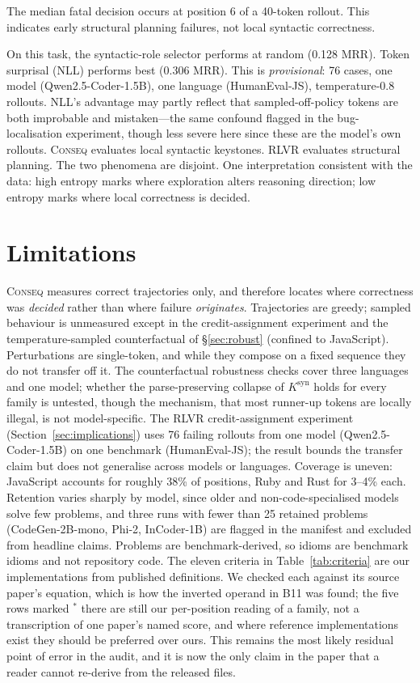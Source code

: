 \documentclass[twoside,11pt]{article}
\begin{document}
The median fatal decision occurs at position 6 of a 40-token rollout. This indicates early structural planning failures, not local syntactic correctness.

On this task, the syntactic-role selector performs at random (0.128 MRR). Token surprisal (NLL) performs best (0.306 MRR). This is \emph{provisional}: 76 cases, one model (Qwen2.5-Coder-1.5B), one language (HumanEval-JS), temperature-0.8 rollouts. NLL's advantage may partly reflect that sampled-off-policy tokens are both improbable and mistaken---the same confound flagged in the bug-localisation experiment, though less severe here since these are the model's own rollouts. \textsc{Conseq} evaluates local syntactic keystones. RLVR evaluates structural planning. The two phenomena are disjoint. One interpretation consistent with the data: high entropy marks where exploration alters reasoning direction; low entropy marks where local correctness is decided.

\section{Limitations}
\label{sec:limitations}

\textsc{Conseq} measures correct trajectories only, and therefore locates where correctness was
\emph{decided} rather than where failure \emph{originates}. Trajectories are greedy; sampled
behaviour is unmeasured except in the credit-assignment experiment and the temperature-sampled
counterfactual of \S\ref{sec:robust} (confined to JavaScript). Perturbations are single-token,
and while they compose on a fixed sequence they do not transfer off it. The counterfactual
robustness checks cover three languages and one model; whether the parse-preserving collapse of
$K^{\mathrm{syn}}$ holds for every family is untested, though the mechanism, that most runner-up
tokens are locally illegal, is not model-specific. The RLVR credit-assignment experiment
(Section~\ref{sec:implications}) uses 76 failing rollouts from one model (Qwen2.5-Coder-1.5B) on one
benchmark (HumanEval-JS); the result bounds the transfer claim but does not generalise across models
or languages. Coverage is uneven:
JavaScript accounts for roughly 38\% of positions, Ruby and Rust for 3--4\% each. Retention varies
sharply by model, since older and non-code-specialised models solve few problems, and three runs with
fewer than 25 retained problems (CodeGen-2B-mono, Phi-2, InCoder-1B) are flagged in the manifest and excluded from headline claims.
Problems are benchmark-derived, so idioms are benchmark idioms and not repository code. The eleven criteria in Table~\ref{tab:criteria} are our implementations from published
definitions. We checked each against its source paper's equation, which is how the inverted
operand in B11 was found; the five rows marked $^\ast$ there are still our per-position reading
of a family, not a transcription of one paper's named score, and where reference
implementations exist they should be preferred over ours. This remains the most likely
residual point of error in the audit, and it is now the only claim in the paper that a reader
cannot re-derive from the released files.
\end{document}
